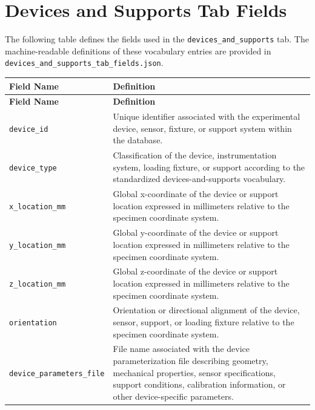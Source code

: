 \documentclass[11pt]{book}
\begin{document}
{%
\section{Devices and Supports Tab Fields}
\label{vocab:devices_and_supports_fields_tab}

The following table defines the fields used in the \texttt{devices\_and\_supports} tab. The machine-readable definitions of these vocabulary entries are provided in \texttt{devices\_and\_supports\_tab\_fields.json}.

\begin{longtable}{p{}p{}}
\hline
\textbf{Field Name} & \textbf{Definition} \\
\hline
\endfirsthead

\hline
\textbf{Field Name} & \textbf{Definition} \\
\hline
\endhead

\texttt{device\_id} &
Unique identifier associated with the experimental device, sensor, fixture, or support system within the database. \\

\texttt{device\_type} &
Classification of the device, instrumentation system, loading fixture, or support according to the standardized devices-and-supports vocabulary. \\

\texttt{x\_location\_mm} &
Global x-coordinate of the device or support location expressed in millimeters relative to the specimen coordinate system. \\

\texttt{y\_location\_mm} &
Global y-coordinate of the device or support location expressed in millimeters relative to the specimen coordinate system. \\

\texttt{z\_location\_mm} &
Global z-coordinate of the device or support location expressed in millimeters relative to the specimen coordinate system. \\

\texttt{orientation} &
Orientation or directional alignment of the device, sensor, support, or loading fixture relative to the specimen coordinate system. \\

\texttt{device\_parameters\_file} &
File name associated with the device parameterization file describing geometry, mechanical properties, sensor specifications, support conditions, calibration information, or other device-specific parameters. \\


\end{longtable}}
\end{document}
